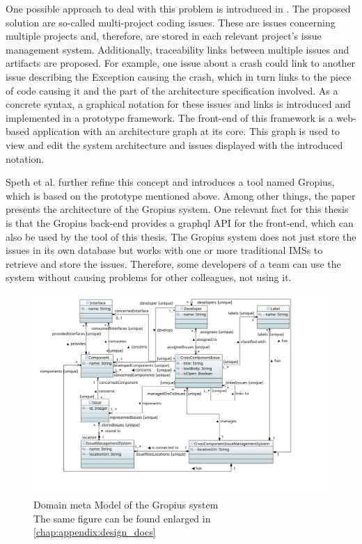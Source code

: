 One possible approach to deal with this problem is introduced in \cite{Speth2019}.
The proposed solution are so-called multi-project coding issues. These are issues concerning multiple projects and, therefore, are stored in each relevant project's issue management system. 
Additionally, traceability links between multiple issues and artifacts are proposed. 
For example, one issue about a crash could link to another issue describing the Exception causing the crash, which in turn links to the piece of code causing it and the part of the architecture specification involved.
As a concrete syntax, a graphical notation for these issues and links is introduced and implemented in a prototype framework. The front-end of this framework is a web-based application with an architecture graph at its core.
This graph is used to view and edit the system architecture and issues displayed with the introduced notation. 

Speth et al. \cite{speth2020gropius} further refine this concept and introduces a tool named \gls{Gropius}, which is based on the prototype mentioned above.
Among other things, the paper presents the architecture of the \gls{Gropius} system. 
One relevant fact for this thesis is that the \gls{Gropius} back-end provides a \gls{graphql} \gls{API} for the front-end,
which can also be used by the tool of this thesis.
The \gls{Gropius} system does not just store the issues in its own database but works with one or more traditional \glspl{IMS} to retrieve and store the issues.
Therefore, some developers of a team can use the system without causing problems for other colleagues, not using it.

\begin{figure}[!h]
	\centering
	\includegraphics[width=\textwidth]{graphics/domainMetaModel.png}
	\caption{Domain meta Model of the \gls{Gropius} system \\ \footnotesize{The same figure can be found enlarged in \cref{chap:appendix:design_docs}}}
	\label{fig:c2:domain_meta_model}
\end{figure}

